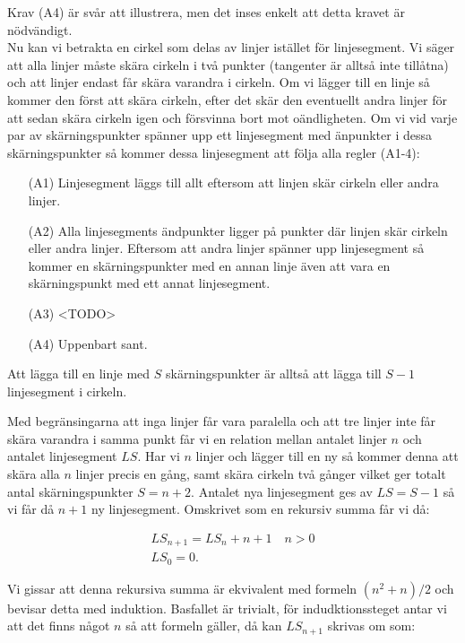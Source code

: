 \documentclass{article}
\begin{document}
Krav (A4) är svår att illustrera, men det inses enkelt att detta kravet är nödvändigt.
\\

Nu kan vi betrakta en cirkel som delas av linjer istället för linjesegment. Vi säger att alla linjer måste skära cirkeln i två punkter (tangenter är alltså inte tillåtna) och att linjer endast får skära varandra i cirkeln. Om vi lägger till en linje så kommer den först att skära cirkeln, efter det skär den eventuellt andra linjer för att sedan skära cirkeln igen och försvinna bort mot oändligheten. Om vi vid varje par av skärningspunkter spänner upp ett linjesegment med änpunkter i dessa skärningspunkter så kommer dessa linjesegment att följa alla regler (A1-4):

\begin{itemize}
  \item[(A1)] Linjesegment läggs till allt eftersom att linjen skär cirkeln eller andra linjer.
  \item[(A2)] Alla linjesegments ändpunkter ligger på punkter där linjen skär cirkeln eller andra linjer. Eftersom att andra linjer spänner upp linjesegment så kommer en skärningspunkter med en annan linje även att vara en skärningspunkt med ett annat linjesegment.
  \item[(A3)] <TODO>
  \item[(A4)] Uppenbart sant.
\end{itemize}

Att lägga till en linje med $S$ skärningspunkter är alltså att lägga till $S - 1$ linjesegment i cirkeln.

Med begränsingarna att inga linjer får vara paralella och att tre linjer inte får skära varandra i samma punkt får vi en relation mellan antalet linjer $n$ och antalet linjesegment $LS$. Har vi $n$ linjer och lägger till en ny så kommer denna att skära alla $n$ linjer precis en gång, samt skära cirkeln två gånger vilket ger totalt antal skärningspunkter $S = n + 2$. Antalet nya linjesegment ges av $LS = S - 1$ så vi får då $n + 1$ ny linjesegment. Omskrivet som en rekursiv summa får vi då:

\begin{gather*}
  LS_{n + 1} = LS_{n} + n + 1 \quad n > 0 \\
  LS_{0} = 0\text{.}
\end{gather*}

Vi gissar att denna rekursiva summa är ekvivalent med formeln $(n ^2 + n) / 2$ och bevisar detta med induktion. Basfallet är trivialt, för indudktionssteget antar vi att det finns något $n$ så att formeln gäller, då kan $LS_{n + 1}$ skrivas om som:
\end{document}
